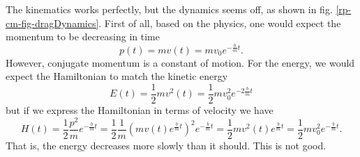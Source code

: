 The kinematics works perfectly, but the dynamics seems off, as shown in fig. \ref{rp-cm-fig-dragDynamics}. First of all, based on the physics, one would expect the momentum to be decreasing in time
\begin{equation}
	p(t)=m v(t) = m v_0 e^{-\frac{b}{m}t}.
\end{equation}
However, conjugate momentum is a constant of motion. For the energy, we would expect the Hamiltonian to match the kinetic energy
\begin{equation}
	E(t)=\frac{1}{2} m v^2(t) = \frac{1}{2} m v_0^2 e^{-2\frac{b}{m}t}
\end{equation}
but if we express the Hamiltonian in terms of velocity we have
\begin{equation}
	H(t)=\frac{1}{2} \frac{p^2}{m} e^{-\frac{b}{m}t} = \frac{1}{2} \frac{1}{m} \left( m v(t) e^{\frac{b}{m}t} \right)^2 e^{-\frac{b}{m}t}= \frac{1}{2} m v^2(t) e^{\frac{b}{m}t} = \frac{1}{2} m v_0^2 e^{-\frac{b}{m}t}.
\end{equation}
That is, the energy decreases more slowly than it should. This is not good.

